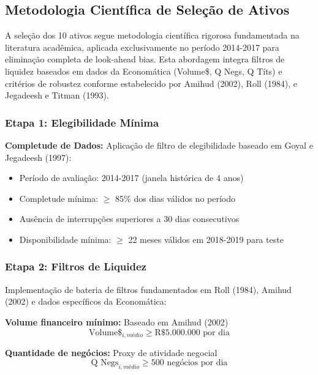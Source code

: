 \subsection{Metodologia Científica de Seleção de Ativos}

A seleção dos 10 ativos segue metodologia científica rigorosa fundamentada na literatura acadêmica, aplicada exclusivamente no período 2014-2017 para eliminação completa de look-ahead bias. Esta abordagem integra filtros de liquidez baseados em dados da Economática (Volume\$, Q Negs, Q Títs) e critérios de robustez conforme estabelecido por Amihud (2002), Roll (1984), e Jegadeesh e Titman (1993).

\subsubsection{Etapa 1: Elegibilidade Mínima}

\textbf{Completude de Dados:} Aplicação de filtro de elegibilidade baseado em Goyal e Jegadeesh (1997):
\begin{itemize}
    \item Período de avaliação: 2014-2017 (janela histórica de 4 anos)
    \item Completude mínima: $\geq$ 85\% dos dias válidos no período
    \item Ausência de interrupções superiores a 30 dias consecutivos
    \item Disponibilidade mínima: $\geq$ 22 meses válidos em 2018-2019 para teste
\end{itemize}

\subsubsection{Etapa 2: Filtros de Liquidez}

Implementação de bateria de filtros fundamentados em Roll (1984), Amihud (2002) e dados específicos da Economática:

\textbf{Volume financeiro mínimo:} Baseado em Amihud (2002)
\begin{equation}
\text{Volume}\$_{i,médio} \geq \text{R\$ 5.000.000 por dia}
\end{equation}

\textbf{Quantidade de negócios:} Proxy de atividade negocial
\begin{equation}
\text{Q Negs}_{i,médio} \geq 500 \text{ negócios por dia}
\end{equation}

